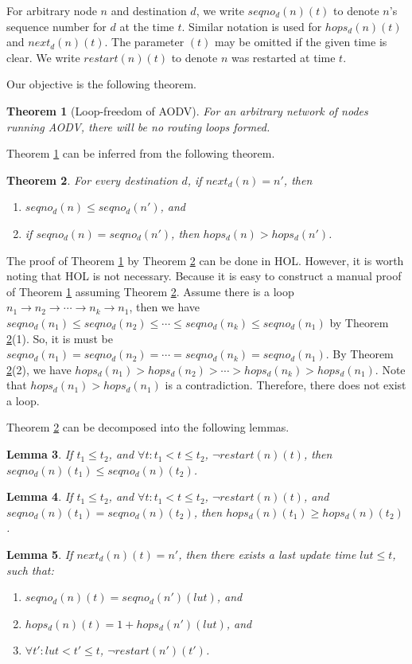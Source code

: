 \documentclass[a4paper,10pt,twocolumn]{article}
\newtheorem{theorem}{Theorem}
\newtheorem{lemma}[theorem]{Lemma}
\begin{document}
For arbitrary node $n$ and destination $d$, we write $seqno_d(n)(t)$ to denote $n$'s sequence number for $d$ at the time $t$. Similar notation is used for $hops_d(n)(t)$ and $next_d(n)(t)$. The parameter $(t)$ may be omitted if the given time is clear. We write $restart(n)(t)$ to denote $n$ was restarted at time $t$.

Our objective is the following theorem.
\begin{theorem}[Loop-freedom of AODV]\label{BOG02:Lem16}
For an arbitrary network of nodes running AODV, there will be no routing loops formed.
\end{theorem}
Theorem \ref{BOG02:Lem16} can be inferred from the following theorem.
\begin{theorem}\label{BOG02:Lem17}
For every destination $d$, if $next_d(n)=n'$, then
\begin{enumerate}
  \item $seqno_d(n) \leq seqno_d(n')$, and
  \item if $seqno_d(n) = seqno_d(n')$, then $hops_d(n) > hops_d(n')$.
\end{enumerate}
\end{theorem}
The proof of Theorem \ref{BOG02:Lem16} by Theorem \ref{BOG02:Lem17} can be done in HOL. However, it is worth noting that HOL is not necessary. Because it is easy to construct a manual proof of Theorem \ref{BOG02:Lem16} assuming Theorem \ref{BOG02:Lem17}. Assume there is a loop $n_1 \rightarrow n_2 \rightarrow \cdots \rightarrow n_k \rightarrow n_1$, then we have $seqno_d(n_1) \leq seqno_d(n_2) \leq \cdots \leq seqno_d(n_k) \leq seqno_d(n_1)$ by Theorem \ref{BOG02:Lem17}(1). So, it is must be $seqno_d(n_1) = seqno_d(n_2) = \cdots = seqno_d(n_k) = seqno_d(n_1)$. By Theorem \ref{BOG02:Lem17}(2), we have $hops_d(n_1) > hops_d(n_2) > \cdots > hops_d(n_k) > hops_d(n_1)$. Note that $hops_d(n_1) > hops_d(n_1)$ is a contradiction. Therefore, there does not exist a loop.

Theorem \ref{BOG02:Lem17} can be decomposed into the following lemmas.
\begin{lemma}\label{BOG02:Lem18}
If $t_1 \leq t_2$, and $\forall t: t_1 < t \leq t_2$, $\neg restart(n)(t)$, then $seqno_d(n)(t_1) \leq seqno_d(n)(t_2)$.
\end{lemma}
\begin{lemma}\label{BOG02:Lem19}
If $t_1 \leq t_2$, and $\forall t: t_1 < t \leq t_2$, $\neg restart(n)(t)$, and $seqno_d(n)(t_1) = seqno_d(n)(t_2)$, then $hops_d(n)(t_1) \geq hops_d(n)(t_2)$.
\end{lemma}
\begin{lemma}\label{BOG02:Lem20}
If $next_d(n)(t)=n'$, then there exists a last update time $lut \leq t$, such that:
\begin{enumerate}
  \item $seqno_d(n)(t) = seqno_d(n')(lut)$, and
  \item $hops_d(n)(t) = 1 + hops_d(n')(lut)$, and
  \item $\forall t': lut <t' \leq t$, $\neg restart(n')(t')$.
\end{enumerate}
\end{lemma}
\end{document}
